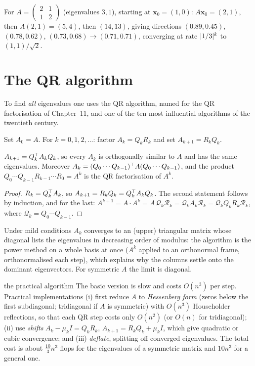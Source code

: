 \begin{example}
For $A=\begin{pmatrix}2&1\\1&2\end{pmatrix}$ (eigenvalues $3,1$), starting at $\mathbf{x}_0=(1,0)$: $A\mathbf{x}_0=(2,1)$, then $A(2,1)=(5,4)$, then $(14,13)$, giving directions $(0.89,0.45)$, $(0.78,0.62)$, $(0.73,0.68)\to(0.71,0.71)$, converging at rate $\lvert1/3\rvert^k$ to $(1,1)/\sqrt2$.
\end{example}

\section{The QR algorithm}

To find \emph{all} eigenvalues one uses the QR algorithm, named for the QR factorisation of Chapter~11, and one of the ten most influential algorithms of the twentieth century.

\begin{definition}
Set $A_0=A$. For $k=0,1,2,\dots$: factor $A_k=Q_kR_k$ and set $A_{k+1}=R_kQ_k$.
\end{definition}

\begin{proposition}[Properties]\label{prop:qralg}
$A_{k+1}=Q_k^{\top} A_kQ_k$, so every $A_k$ is orthogonally similar to $A$ and has the same eigenvalues. Moreover $A_k=(Q_0\cdots Q_{k-1})^{\top} A(Q_0\cdots Q_{k-1})$, and the product $Q_0\cdots Q_{k-1}R_{k-1}\cdots R_0=A^k$ is the QR factorisation of $A^k$.
\end{proposition}

\begin{proof}
$R_k=Q_k^{\top} A_k$, so $A_{k+1}=R_kQ_k=Q_k^{\top} A_kQ_k$. The second statement follows by induction, and for the last: $A^{k+1}=A\cdot A^k=A\,\mathcal{Q}_k\mathcal{R}_k=\mathcal{Q}_kA_k\mathcal{R}_k=\mathcal{Q}_kQ_kR_k\mathcal{R}_k$, where $\mathcal{Q}_k=Q_0\cdots Q_{k-1}$.
\end{proof}

Under mild conditions $A_k$ converges to an (upper) triangular matrix whose diagonal lists the eigenvalues in decreasing order of modulus: the algorithm is the power method on a whole basis at once ($A^k$ applied to an orthonormal frame, orthonormalised each step), which explains why the columns settle onto the dominant eigenvectors. For symmetric $A$ the limit is diagonal.

\begin{nuance}{the practical algorithm}
The basic version is slow and costs $O(n^3)$ per step. Practical implementations (i) first reduce $A$ to \emph{Hessenberg form} (zeros below the first subdiagonal; tridiagonal if $A$ is symmetric) with $O(n^3)$ Householder reflections, so that each QR step costs only $O(n^2)$ (or $O(n)$ for tridiagonal); (ii) use \emph{shifts} $A_k-\mu_kI=Q_kR_k$, $A_{k+1}=R_kQ_k+\mu_kI$, which give quadratic or cubic convergence; and (iii) \emph{deflate}, splitting off converged eigenvalues. The total cost is about $\frac{10}3n^3$ flops for the eigenvalues of a symmetric matrix and $10n^3$ for a general one.
\end{nuance}

